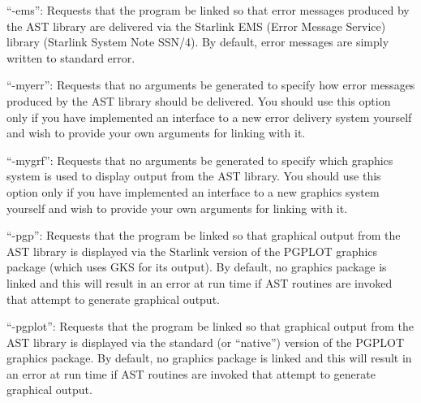 \documentclass[twoside,11pt]{article}
\newcommand{\htmlref}[2]{#1}
\begin{document}
{{{         \sstitem
         ``-ems'': Requests that the program be linked so that error messages
         produced by the AST library are delivered via the Starlink EMS (Error
         Message Service) library (Starlink \htmlref{System}{System} Note SSN/4). By default,
         error messages are simply written to standard error.

         \sstitem
         ``-myerr'': Requests that no arguments be generated to specify how
         error messages produced by the AST library should be delivered. You
         should use this option only if you have implemented an interface to a
         new error delivery system yourself and wish to provide your own
         arguments for linking with it.

         \sstitem
         ``-mygrf'': Requests that no arguments be generated to specify which
         graphics system is used to display output from the AST library. You
         should use this option only if you have implemented an interface to a
         new graphics system yourself and wish to provide your own arguments for
         linking with it.

         \sstitem
         ``-pgp'': Requests that the program be linked so that
         graphical output from the AST library is displayed via the
         Starlink version of the PGPLOT graphics package (which uses GKS
         for its output). By default, no graphics package is linked and
         this will result in an error at run time if AST routines are
         invoked that attempt to generate graphical output.

         \sstitem
         ``-pgplot'': Requests that the program be linked so that
         graphical output from the AST library is displayed via the
         standard (or ``native'') version of the PGPLOT graphics
         package. By default, no graphics package is linked and this will
         result in an error at run time if AST routines are invoked that
         attempt to generate graphical output.
      }
   }
}
\end{document}
